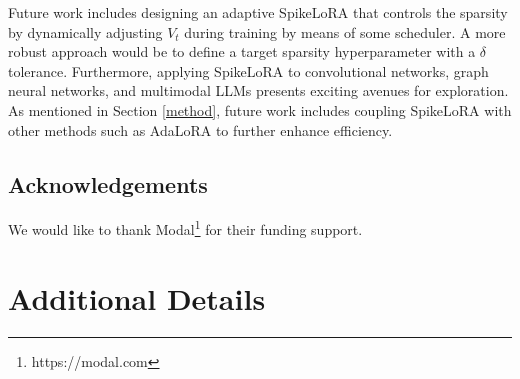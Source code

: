 \documentclass{article} %
\begin{document}
Future work includes designing an adaptive SpikeLoRA that controls the sparsity by dynamically adjusting \(V_t\) during training by means of some scheduler. A more robust approach would be to define a target sparsity hyperparameter with a \(\delta\) tolerance. Furthermore, applying SpikeLoRA to convolutional networks, graph neural networks, and multimodal LLMs presents exciting avenues for exploration. As mentioned in Section \ref{method}, future work includes coupling SpikeLoRA with other methods such as AdaLoRA to further enhance efficiency.

\subsection*{Acknowledgements}
We would like to thank Modal\footnote{https://modal.com} for their funding support.





\newpage

\appendix

\setcounter{figure}{0}
\setcounter{table}{0}
\setcounter{equation}{0}

\section{Additional Details}
\label{app:a}

\begin{table}[htbp]
  \centering
  \caption{Unless otherwise stated, this is our standard hyperparameter setup used to perform experiments.}
  \label{tab:best_params}
\end{table}
\end{document}
